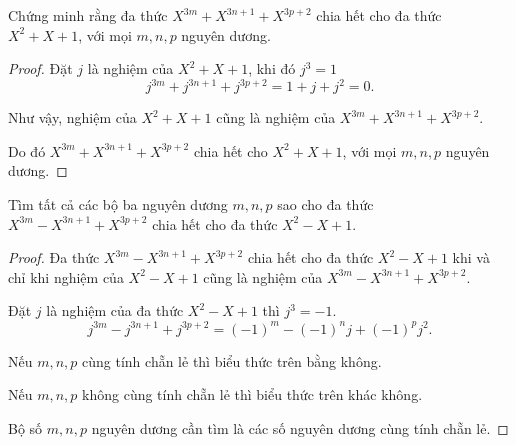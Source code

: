 \begin{exercise}Chứng minh rằng đa thức $X^{3m} + X^{3n + 1} + X^{3p  + 2}$ chia hết cho đa thức $X^{2} + X + 1$, với mọi $m, n, p$ nguyên dương.
\end{exercise}

\begin{proof}
    Đặt $j$ là nghiệm của $X^{2} + X + 1$, khi đó $j^{3} = 1$
    $$
        j^{3m} + j^{3n + 1} + j^{3p + 2} = 1 + j + j^{2} = 0.
    $$
    
    Như vậy, nghiệm của $X^{2} + X + 1$ cũng là nghiệm của $X^{3m} + X^{3n + 1} + X^{3p + 2}$.
    
    Do đó $X^{3m} + X^{3n + 1} + X^{3p +2}$ chia hết cho $X^{2} + X + 1$, với mọi $m, n, p$ nguyên dương.
\end{proof}

\begin{exercise}
    Tìm tất cả các bộ ba nguyên dương $m, n, p$ sao cho đa thức $X^{3m} - X^{3n + 1} + X^{3p + 2}$ chia hết cho đa thức $X^{2} - X + 1$.
\end{exercise}

\begin{proof}
    Đa thức $X^{3m} - X^{3n + 1} + X^{3p + 2}$ chia hết cho đa thức $X^{2} - X + 1$ khi và chỉ khi nghiệm của $X^{2} - X + 1$ cũng là nghiệm của $X^{3m} - X^{3n + 1} + X^{3p + 2}$.
    
    Đặt $j$ là nghiệm của đa thức $X^{2} - X + 1$ thì $j^{3} = -1$.
    $$
        j^{3m} - j^{3n + 1} + j^{3p + 2} = {(-1)}^{m} - {(-1)}^{n}j + {(-1)}^{p}j^{2}.
    $$
    
    Nếu $m, n, p$ cùng tính chẵn lẻ thì biểu thức trên bằng không.
    
    Nếu $m, n, p$ không cùng tính chẵn lẻ thì biểu thức trên khác không.
    
    Bộ số $m, n, p$ nguyên dương cần tìm là các số nguyên dương cùng tính chẵn lẻ.
\end{proof}

